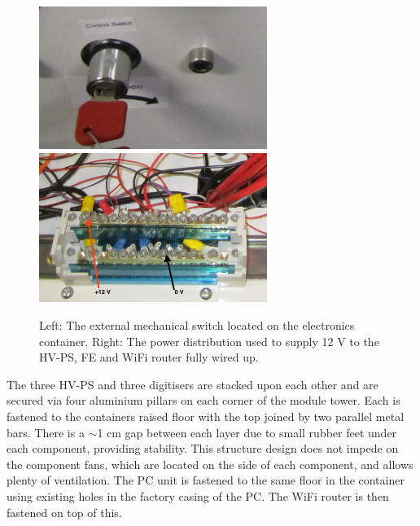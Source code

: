 \begin{figure}[htbp]
\begin{center}
\includegraphics[width=74mm]{Chapter6/figures/powerSwitch.jpg}
\includegraphics[width=74mm]{Chapter6/figures/powerDistribution.jpg}
\caption{Left: The external mechanical switch located on the electronics container. Right: The power distribution used to supply 12 V to the HV-PS, FE and WiFi router fully wired up.}
\label{fig:powerSwitchAndDistribution}
\end{center}
\end{figure}

The three HV-PS and three digitisers are stacked upon each other and are secured via four aluminium pillars on each corner of the module tower. Each is fastened to the containers raised floor with the top joined by two parallel metal bars. There is a $\sim$1 cm gap between each layer due to small rubber feet under each component, providing stability. This structure design does not impede on the component fans, which are located on the side of each component, and allows plenty of ventilation. The PC unit is fastened to the same floor in the container using existing holes in the factory casing of the PC. The WiFi router is then fastened on top of this. 


